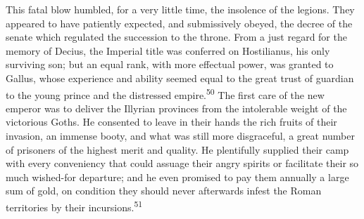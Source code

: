 




This fatal blow humbled, for a very little time, the insolence of
the legions. They appeared to have patiently expected, and
submissively obeyed, the decree of the senate which regulated the
succession to the throne. From a just regard for the memory of
Decius, the Imperial title was conferred on Hostilianus, his only
surviving son; but an equal rank, with more effectual power, was
granted to Gallus, whose experience and ability seemed equal to
the great trust of guardian to the young prince and the
distressed empire.\textsuperscript{50} The first care of the new emperor was to
deliver the Illyrian provinces from the intolerable weight of the
victorious Goths. He consented to leave in their hands the rich
fruits of their invasion, an immense booty, and what was still
more disgraceful, a great number of prisoners of the highest
merit and quality. He plentifully supplied their camp with every
conveniency that could assuage their angry spirits or facilitate
their so much wished-for departure; and he even promised to pay
them annually a large sum of gold, on condition they should never
afterwards infest the Roman territories by their incursions.\textsuperscript{51}



